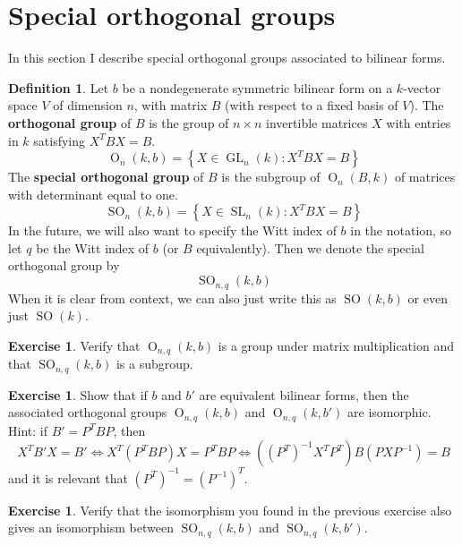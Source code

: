 \documentclass[12pt]{article}
\theoremstyle{definition}
\newtheorem{definition}[theorem]{Definition}
\newtheorem{exercise}[theorem]{Exercise}
\numberwithin{theorem}{subsection}
\newcommand{\lp}{\left(}
\newcommand{\rp}{\right)}
\newcommand{\lb}{\left\{}
\newcommand{\rb}{\right\}}
\newcommand{\tbf}{\textbf}
\newcommand{\inv}{^{-1}}
\DeclareMathOperator{\SL}{SL}
\DeclareMathOperator{\GL}{GL}
\DeclareMathOperator{\OO}{O}
\DeclareMathOperator{\SO}{SO}
\begin{document}
\newpage
\section{Special orthogonal groups}

In this section I describe special orthogonal groups associated to bilinear forms. 

\begin{definition}
Let $b$ be a nondegenerate symmetric bilinear form on a $k$-vector space $V$ of dimension $n$, with matrix $B$ (with respect to a fixed basis of $V$). The \tbf{orthogonal group} of $B$ is the group of $n \times n$ invertible matrices $X$ with entries in $k$ satisfying $X^T BX = B$.
\[
	\OO_n(k,b) = \lb X \in \GL_n(k) : X^T BX = B \rb
\]
The \tbf{special orthogonal group} of $B$ is the subgroup of $\OO_n(B,k)$ of matrices with determinant equal to one.
\[
	\SO_n(k,b) = \lb X \in \SL_n(k) : X^T BX = B \rb
\]
In the future, we will also want to specify the Witt index of $b$ in the notation, so let $q$ be the Witt index of $b$ (or $B$ equivalently). Then we denote the special orthogonal group by
\[
	\SO_{n,q}(k,b)
\]
When it is clear from context, we can also just write this as $\SO(k,b)$ or even just $\SO(k)$.
\end{definition}

\begin{exercise}
Verify that $\OO_{n,q}(k,b)$ is a group under matrix multiplication and that $\SO_{n,q}(k,b)$ is a subgroup.
\end{exercise}

\begin{exercise}
\label{equivalent forms give isomorphic groups}
Show that if $b$ and $b'$ are equivalent bilinear forms, then the associated orthogonal groups $\OO_{n,q}(k,b)$ and $\OO_{n,q}(k,b')$ are isomorphic. Hint: if $B' = P^T B P$, then
\[
	X^T B' X = B' \iff X^T \lp P^T BP \rp X = P^T BP \iff \lp (P^T) \inv X^T P^T \rp B \lp P X P \inv \rp = B
\]
and it is relevant that $(P^T) \inv = (P \inv)^T$.
\end{exercise}

\begin{exercise}
Verify that the isomorphism you found in the previous exercise also gives an isomorphism between $\SO_{n,q}(k,b)$ and $\SO_{n,q}(k,b')$.
\end{exercise}
\end{document}
